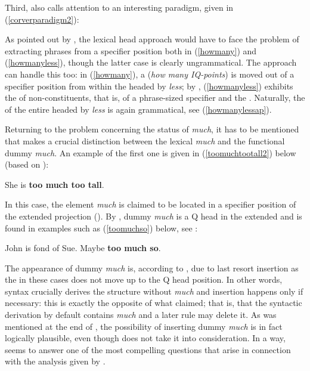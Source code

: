 Third, \citet[125, ex. 18]{corver1997} also calls attention to an interesting  paradigm, given in (\ref{corverparadigm2}):

\ea \label{corverparadigm2}
 \label{howmany}
 \label{howmanyless}
 \label{howmanylessap}
\z
\z

As pointed out by \citet[125--126]{corver1997}, the lexical head approach would have to face the problem of extracting phrases from a specifier position both in (\ref{howmany}) and (\ref{howmanyless}), though the latter case is clearly ungrammatical. The  approach can handle this too: in (\ref{howmany}), a  (\textit{how many IQ-points}) is moved out of a specifier position from within the  headed by \textit{less}; by , (\ref{howmanyless}) exhibits the  of non-constituents, that is, of a phrase-sized specifier and the . Naturally, the  of the entire  headed by \textit{less} is again grammatical, see (\ref{howmanylessap}).

Returning to the problem concerning the status of \textit{much}, it has to be mentioned that \citet[123]{corver1997} makes a crucial distinction between the lexical  \textit{much} and the functional dummy  \textit{much}. An example of the first one is given in (\ref{toomuchtootall2}) below (based on \citealt[121, ex. 5]{corver1997}):

\ea She is \textbf{too much too tall}. \label{toomuchtootall2}
\z

In this case, the element \textit{much} is claimed to be located in a specifier position of the extended  projection (\citealt[123]{corver1997}). By , dummy \textit{much} is a Q head in the extended  and is found in examples such as (\ref{toomuchso}) below, see \citet[123, ex. 11]{corver1997}:

\ea John is fond of Sue. Maybe \textbf{too much so}. \label{toomuchso}
\z

The appearance of dummy \textit{much} is, according to \citet[123]{corver1997}, due to last resort insertion as the  in these cases does not move up to the Q head position. In other words, syntax crucially derives the structure without \textit{much} and insertion happens only if necessary: this is exactly the opposite of what \citet{bresnan1973} claimed; that is, that the syntactic derivation by default contains \textit{much} and a later rule may delete it. As was mentioned at the end of , the possibility of inserting dummy \textit{much} is in fact logically plausible, even though \citet{bresnan1973} does not take it into consideration. In a way, \citet{corver1997} seems to answer one of the most compelling questions that arise in connection with the analysis given by \citet{bresnan1973}.

